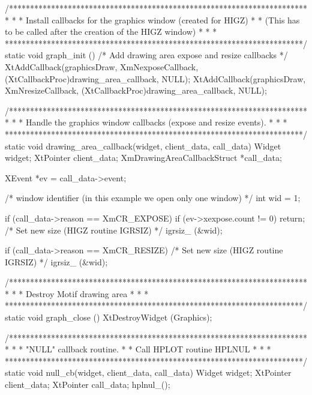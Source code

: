 /***********************************************************************
 *                                                                     *
 *   Install callbacks for the graphics window (created for HIGZ)      *
 *   (This has to be called after the creation of the HIGZ window)     *
 *                                                                     *
 ***********************************************************************/
static void graph_init ()
{
   /* Add drawing area expose and resize callbacks */
   XtAddCallback(graphicsDraw, XmNexposeCallback,
                 (XtCallbackProc)drawing_area_callback, NULL);
   XtAddCallback(graphicsDraw, XmNresizeCallback,
                 (XtCallbackProc)drawing_area_callback, NULL);
}

/***********************************************************************
 *                                                                     *
 *   Handle the graphics window callbacks (expose and resize events).  *
 *                                                                     *
 ***********************************************************************/
static void drawing_area_callback(widget, client_data, call_data)
       Widget widget;
       XtPointer client_data;
       XmDrawingAreaCallbackStruct *call_data;
{
   XEvent *ev = call_data->event;

   /* window identifier (in this example we open only one window) */
   int wid = 1;

   if (call_data->reason == XmCR_EXPOSE) {
      if (ev->xexpose.count != 0) return;
      /* Set new size (HIGZ routine IGRSIZ) */
      igrsiz_ (&wid);
   }

   if (call_data->reason == XmCR_RESIZE) {
      /* Set new size (HIGZ routine IGRSIZ) */
      igrsiz_ (&wid);
   }

}

/***********************************************************************
 *                                                                     *
 *   Destroy Motif drawing area                                        *
 *                                                                     *
 ***********************************************************************/
static void graph_close ()
{
   XtDestroyWidget (Graphics);
}

/***********************************************************************
 *                                                                     *
 *   "NULL" callback routine.                                          *
 *   Call HPLOT routine HPLNUL                                         *
 *                                                                     *
 ***********************************************************************/
static void null_cb(widget, client_data,  call_data)
     Widget widget;
     XtPointer client_data;
     XtPointer call_data;
{
   hplnul_();
}

